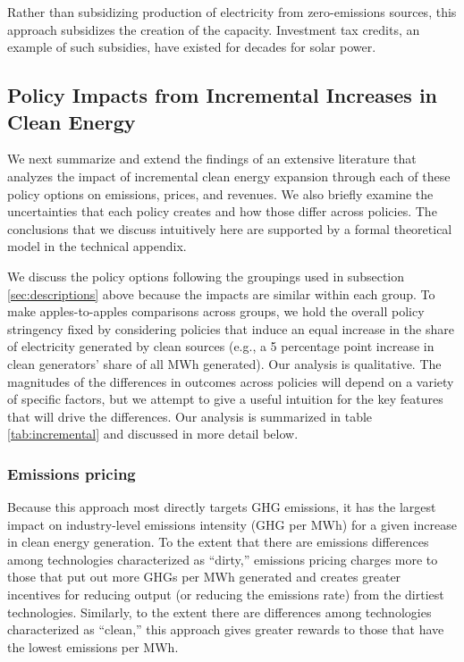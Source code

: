 \documentclass[12pt]{article}
\begin{document}
\medskip{}  Rather than subsidizing production of electricity from zero-emissions sources, this approach subsidizes the creation of the capacity. Investment tax credits, an example of such subsidies, have existed for decades for solar power.


\subsection{Policy Impacts from Incremental Increases in Clean Energy}\label{sec:incremental}

We next summarize and extend the findings of an extensive literature that analyzes the impact of incremental clean energy expansion through each of these policy options on emissions, prices, and revenues. We also briefly examine the uncertainties that each policy creates and how those differ across policies. The conclusions that we discuss intuitively here are supported by a formal theoretical model in the technical appendix.

We discuss the policy options following the groupings used in subsection \ref{sec:descriptions} above because the impacts are similar within each group. To make apples-to-apples comparisons across groups, we hold the overall policy stringency fixed by considering policies that induce an equal increase in the share of electricity generated by clean sources (e.g., a 5 percentage point increase in clean generators' share of all MWh generated). Our analysis is qualitative. The magnitudes of the differences in outcomes across policies will depend on a variety of specific factors, but we attempt to give a useful intuition for the key features that will drive the differences. Our analysis is summarized in table \ref{tab:incremental} and discussed in more detail below.



\subsubsection{Emissions pricing}  Because this approach most directly targets GHG emissions, it has the largest impact on industry-level emissions intensity (GHG per MWh) for a given increase in clean energy generation. To the extent that there are emissions differences among technologies characterized as ``dirty,'' emissions pricing charges more to those that put out more GHGs per MWh generated and creates greater incentives for reducing output (or reducing the emissions rate) from the dirtiest technologies. Similarly, to the extent there are differences among technologies characterized as ``clean,'' this approach gives greater rewards to those that have the lowest emissions per MWh. 
\end{document}
